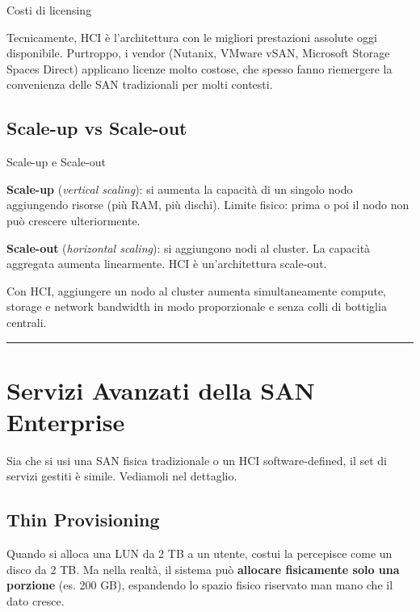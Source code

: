 \documentclass[
  italian,
  openany]{book}
\begin{document}
\begin{calloutwarning}{Costi di licensing}

Tecnicamente, HCI è l'architettura con le migliori prestazioni assolute
oggi disponibile. Purtroppo, i vendor (Nutanix, VMware vSAN, Microsoft
Storage Spaces Direct) applicano licenze molto costose, che spesso fanno
riemergere la convenienza delle SAN tradizionali per molti contesti.

\end{calloutwarning}

\subsection{Scale-up vs Scale-out}\label{scale-up-vs-scale-out-1}

\begin{calloutdefinition}{Scale-up e Scale-out}

\textbf{Scale-up} (\emph{vertical scaling}): si aumenta la capacità di
un singolo nodo aggiungendo risorse (più RAM, più dischi). Limite
fisico: prima o poi il nodo non può crescere ulteriormente.

\textbf{Scale-out} (\emph{horizontal scaling}): si aggiungono nodi al
cluster. La capacità aggregata aumenta linearmente. HCI è
un'architettura scale-out.

\end{calloutdefinition}

Con HCI, aggiungere un nodo al cluster aumenta simultaneamente compute,
storage e network bandwidth in modo proporzionale e senza colli di
bottiglia centrali.

\begin{center}\rule{0.5\linewidth}{0.5pt}\end{center}

\section{Servizi Avanzati della SAN
Enterprise}\label{servizi-avanzati-della-san-enterprise}

Sia che si usi una SAN fisica tradizionale o un HCI software-defined, il
set di servizi gestiti è simile. Vediamoli nel dettaglio.

\subsection{Thin Provisioning}\label{thin-provisioning}

Quando si alloca una LUN da 2 TB a un utente, costui la percepisce come
un disco da 2 TB. Ma nella realtà, il sistema può \textbf{allocare
fisicamente solo una porzione} (es. 200 GB), espandendo lo spazio fisico
riservato man mano che il dato cresce.
\end{document}
